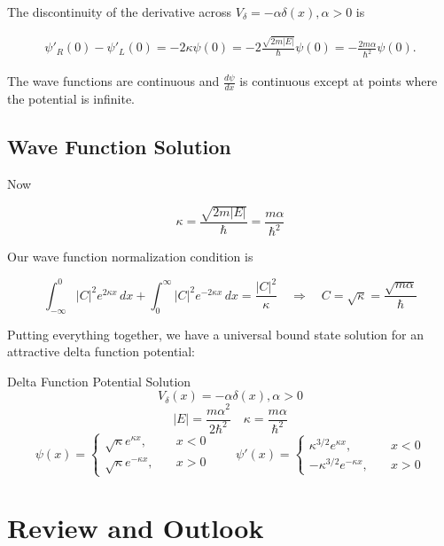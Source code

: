 \begin{subbox}{}
  The discontinuity of the derivative across $V_\delta = -\alpha \delta(x),
  \alpha > 0$ is 

  \begin{align} \label{delta_discon} 
    \psi'_R(0) - \psi'_L(0) = -2\kappa \psi(0) = -2
    \frac{\sqrt{2m|E|}}{\hbar}\psi(0)
  = -\frac{2m\alpha}{\hbar^2}\psi(0).
  \end{align}

  The wave functions are continuous and $ \frac{d \psi}{d x} $ is continuous
  except at points where the potential is infinite. 
\end{subbox}


\subsection{Wave Function Solution} 

Now 

\[
\kappa = \frac{\sqrt{2m|E|}}{\hbar} = \frac{m\alpha}{\hbar^2}
\] \vspace{3px}

Our wave function normalization condition is 

\[
  \int_{-\infty}^{0} |C|^2e^{2\kappa x} \, dx + \int_{0}^{\infty} |C|^2
  e^{-2\kappa x} \, dx = \frac{|C|^2}{\kappa} \quad \Rightarrow \quad
  C = \sqrt{\kappa} = \frac{\sqrt{m\alpha}}{\hbar}
\] \vspace{3px}

Putting everything together, we have a universal bound state solution for an
attractive delta function potential:

\begin{mainbox}{Delta Function Potential Solution}
  \[ V_\delta (x) = -\alpha \delta(x), \alpha > 0 \] 
  \[ |E| = \frac{m\alpha^2}{2\hbar^2} \quad \kappa = \frac{m\alpha}{\hbar^2} \]
  \[ \psi(x) = \begin{cases}
    \sqrt{\kappa}e^{\kappa x}, &\quad x < 0 \\ \sqrt{\kappa} e^{-\kappa x},
                               &\quad x > 0
  \end{cases} \qquad  \psi'(x) = \begin{cases}
    \kappa^{3/2} e^{\kappa x}, &\quad x < 0 \\ -\kappa^{3/2} e^{-\kappa x},
                               &\quad x > 0
  \end{cases} \]
\end{mainbox}

\section{Review and Outlook} 

